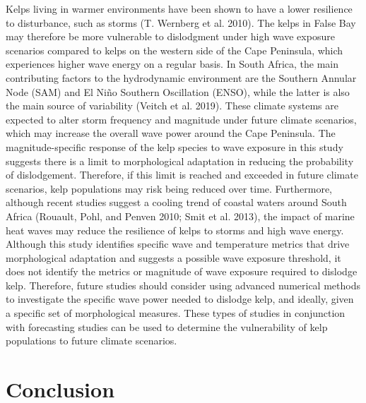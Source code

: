 \documentclass[
  a4paper,
]{article}
\begin{document}
Kelps living in warmer environments have been shown to have a lower
resilience to disturbance, such as storms (T. Wernberg et al. 2010). The
kelps in False Bay may therefore be more vulnerable to dislodgment under
high wave exposure scenarios compared to kelps on the western side of
the Cape Peninsula, which experiences higher wave energy on a regular
basis. In South Africa, the main contributing factors to the
hydrodynamic environment are the Southern Annular Node (SAM) and El Niño
Southern Oscillation (ENSO), while the latter is also the main source of
variability (Veitch et al. 2019). These climate systems are expected to
alter storm frequency and magnitude under future climate scenarios,
which may increase the overall wave power around the Cape Peninsula. The
magnitude-specific response of the kelp species to wave exposure in this
study suggests there is a limit to morphological adaptation in reducing
the probability of dislodgement. Therefore, if this limit is reached and
exceeded in future climate scenarios, kelp populations may risk being
reduced over time. Furthermore, although recent studies suggest a
cooling trend of coastal waters around South Africa (Rouault, Pohl, and
Penven 2010; Smit et al. 2013), the impact of marine heat waves may
reduce the resilience of kelps to storms and high wave energy. Although
this study identifies specific wave and temperature metrics that drive
morphological adaptation and suggests a possible wave exposure
threshold, it does not identify the metrics or magnitude of wave
exposure required to dislodge kelp. Therefore, future studies should
consider using advanced numerical methods to investigate the specific
wave power needed to dislodge kelp, and ideally, given a specific set of
morphological measures. These types of studies in conjunction with
forecasting studies can be used to determine the vulnerability of kelp
populations to future climate scenarios.

\hypertarget{conclusion}{%
\section{Conclusion}\label{conclusion}}
\end{document}
